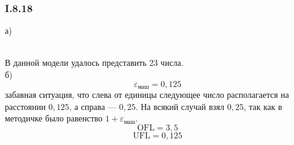 \subsubsection*{I.8.18}
а)
\begin{figure}[h]
\end{figure}\\
В данной модели удалось представить 23 числа.\\
б) 
$$\varepsilon_{маш} = 0,125$$
забавная ситуация, что слева от единицы следующее число располагается на расстоянии $0,125$, а справа --- $0,25$. На всякий случай взял $0,25$, так как в методичке было равенство $1 + \varepsilon_{маш}$.
$$\text{OFL} = 3,5$$
$$\text{UFL} = 0,125$$